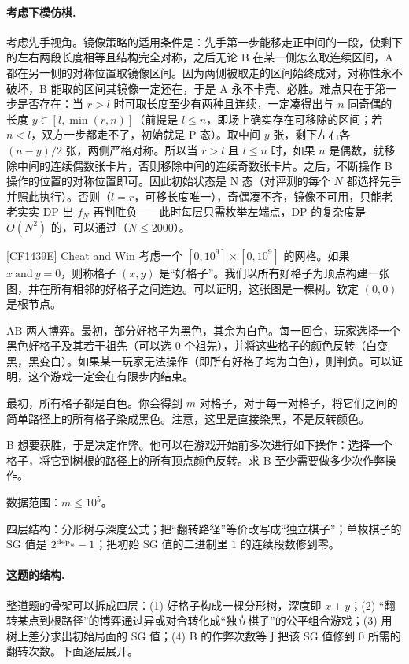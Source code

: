\paragraph{考虑下模仿棋.} 考虑先手视角。镜像策略的适用条件是：先手第一步能移走正中间的一段，使剩下的左右两段长度相等且结构完全对称，之后无论 B 在某一侧怎么取连续区间，A 都在另一侧的对称位置取镜像区间。因为两侧被取走的区间始终成对，对称性永不破坏，B 能取的区间其镜像一定还在，于是 A 永不卡壳、必胜。难点只在于第一步是否存在：当 $r>l$ 时可取长度至少有两种且连续，一定凑得出与 $n$ 同奇偶的长度 $y\in[l,\min(r,n)]$（前提是 $l\le n$，即场上确实存在可移除的区间；若 $n<l$，双方一步都走不了，初始就是 P 态）。取中间 $y$ 张，剩下左右各 $(n-y)/2$ 张，两侧严格对称。所以当 $r>l$ 且 $l\le n$ 时，如果 $n$ 是偶数，就移除中间的连续偶数张卡片，否则移除中间的连续奇数张卡片。之后，不断操作 B 操作的位置的对称位置即可。因此初始状态是 N 态（对评测的每个 $N$ 都选择先手并照此执行）。否则（$l=r$，可移长度唯一），奇偶凑不齐，镜像不可用，只能老老实实 DP 出 $f_N$ 再判胜负——此时每层只需枚举左端点，DP 的复杂度是 $O(N^{2})$ 的，可以通过（$N\le2000$）。


\begin{problem}{[CF1439E] Cheat and Win}
考虑一个 $[0,10^{9}]\times[0,10^{9}]$ 的网格。如果 $x\ \mathrm{and}\ y=0$，则称格子 $(x,y)$ 是“好格子”。我们以所有好格子为顶点构建一张图，并在所有相邻的好格子之间连边。可以证明，这张图是一棵树。钦定 $(0,0)$ 是根节点。

AB 两人博弈。最初，部分好格子为黑色，其余为白色。每一回合，玩家选择一个黑色好格子及其若干祖先（可以选 $0$ 个祖先），并将这些格子的颜色反转（白变黑，黑变白）。如果某一玩家无法操作（即所有好格子均为白色），则判负。可以证明，这个游戏一定会在有限步内结束。

最初，所有格子都是白色。你会得到 $m$ 对格子，对于每一对格子，将它们之间的简单路径上的所有格子染成黑色。注意，这里是直接染黑，不是反转颜色。

B 想要获胜，于是决定作弊。他可以在游戏开始前多次进行如下操作：选择一个格子，将它到树根的路径上的所有顶点颜色反转。求 B 至少需要做多少次作弊操作。

数据范围：$m\le10^{5}$。
\end{problem}

\hint 四层结构：分形树与深度公式；把“翻转路径”等价改写成“独立棋子”；单枚棋子的 SG 值是 $2^{\operatorname{dep}_u}-1$；把初始 SG 值的二进制里 $1$ 的连续段数修到零。

\sol \paragraph{这题的结构.} 整道题的骨架可以拆成四层：(1) 好格子构成一棵分形树，深度即 $x+y$；(2) “翻转某点到根路径”的博弈通过异或对合转化成“独立棋子”的公平组合游戏；(3) 用树上差分求出初始局面的 SG 值；(4) B 的作弊次数等于把该 SG 值修到 $0$ 所需的翻转次数。下面逐层展开。


